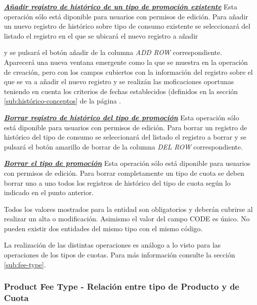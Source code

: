\underline{\textsl{\textbf{Añadir registro de histórico de un tipo de promoción existente}}}\newline
Esta operación sólo está diponible para usuarios con permisos de edición.
Para añadir un nuevo registro de histórico sobre tipo de consumo existente se seleccionará del listado el registro en el que se ubicará el nuevo registro a añadir 

y se pulsará el botón añadir de la columna \textit{ADD ROW} correspondiente. Aparecerá una nueva ventana emergente como la que se muestra en la operación de creación, pero con los campos cubiertos con la información del registro sobre el que se va a añadir el nuevo registro y se realizán las moficaciones oportunas teniendo en cuenta los criterios de fechas establecidos (definidos en la sección \ref{sub:histórico-conceptos} de la página \pageref{sub:histórico-conceptos}.

\underline{\textsl{\textbf{Borrar registro de histórico del tipo de promoción}}}\newline
Esta operación sólo está diponible para usuarios con permisos de edición.
Para borrar un registro de histórico del tipo de consumo se seleccionará del listado el registro a borrar y se pulsará el botón amarillo de borrar de la columna \textit{DEL ROW} correspondiente.\newline

\underline{\textsl{\textbf{Borrar el tipo de promoción}}}\newline
Esta operación sólo está diponible para usuarios con permisos de edición.
Para borrar completamente un tipo de cuota se deben borrar uno a uno todos los registros de histórico del tipo de cuota según lo indicado en el punto anterior. 

Todos los valores mostrados para la entidad son obligatorios y deberán cubrirse al realizar un alta o modificación. Asimismo el valor del campo CODE es único. No pueden existir dos entidades del mismo tipo con el mismo código.

La realización de las distintas operaciones es análogo a lo visto para las operaciones de los tipos de cuotas. Para más información consulte la sección \ref{sub:fee-type}.


\subsubsection{Product Fee Type - Relación entre tipo de Producto y de Cuota}
\label{sub:product-fee-type-relation}


